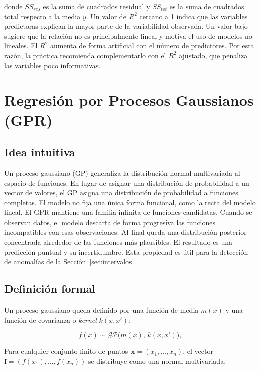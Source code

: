 donde $SS_{res}$ es la suma de cuadrados residual y $SS_{tot}$ es la suma de cuadrados total respecto a la media $\bar{y}$. Un valor de $R^2$ cercano a 1 indica que las variables predictoras explican la mayor parte de la variabilidad observada. Un valor bajo sugiere que la relación no es principalmente lineal y motiva el uso de modelos no lineales. El $R^2$ aumenta de forma artificial con el número de predictores. Por esta razón, la práctica recomienda complementarlo con el $R^2$ ajustado, que penaliza las variables poco informativas.

\section{Regresión por Procesos Gaussianos (GPR)}
\label{sec:gpr}

\subsection{Idea intuitiva}

Un proceso gaussiano (GP) generaliza la distribución normal multivariada al espacio de funciones. En lugar de asignar una distribución de probabilidad a un vector de valores, el GP asigna una distribución de probabilidad a funciones completas. El modelo no fija una única forma funcional, como la recta del modelo lineal. El GPR mantiene una familia infinita de funciones candidatas. Cuando se observan datos, el modelo descarta de forma progresiva las funciones incompatibles con esas observaciones. Al final queda una distribución posterior concentrada alrededor de las funciones más plausibles. El resultado es una predicción puntual y su incertidumbre. Esta propiedad es útil para la detección de anomalías de la Sección~\ref{sec:intervalos}.

\subsection{Definición formal}

Un proceso gaussiano queda definido por una función de media $m(x)$ y una función de covarianza o \textit{kernel} $k(x,x')$:

\begin{equation}
f(x) \sim \mathcal{GP}\big(m(x),\, k(x,x')\big),
\label{eq:gpr}
\end{equation}

Para cualquier conjunto finito de puntos $\mathbf{x}=(x_1,\dots,x_n)$, el vector $\mathbf{f}=(f(x_1),\dots,f(x_n))$ se distribuye como una normal multivariada:

